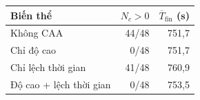 \begin{tabular}{@{}lrr@{}}
\toprule
Biến thể & $N_c>0$ & $\overline{T}_{\mathrm{fin}}$ (s) \\
\midrule
Không CAA        & 44/48 & 751{,}7 \\
Chỉ độ cao       & 0/48  & 751{,}7 \\
Chỉ lệch thời gian       & 41/48 & 760{,}9 \\
Độ cao + lệch thời gian  & 0/48  & 753{,}5 \\
\bottomrule
\end{tabular}
